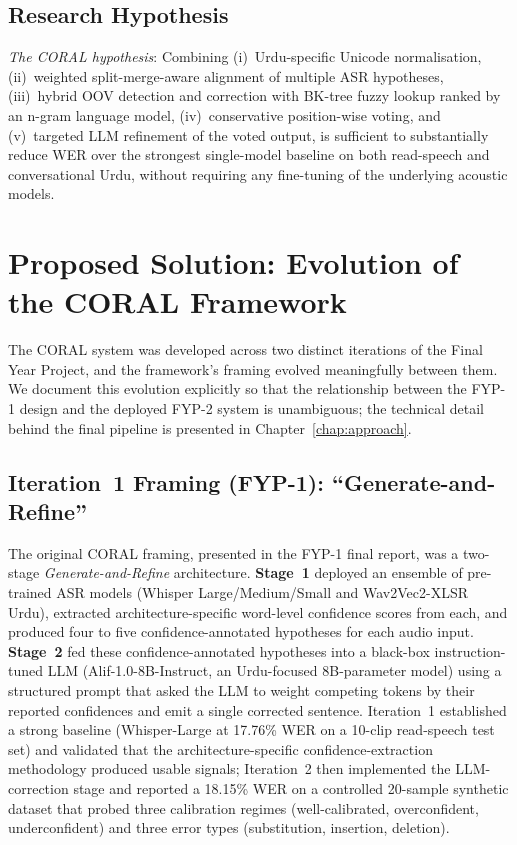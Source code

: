 \subsection{Research Hypothesis}
\label{ssec:hypothesis}

\textit{The CORAL hypothesis}: Combining (i)~Urdu-specific Unicode normalisation, (ii)~weighted split-merge-aware alignment of multiple ASR hypotheses, (iii)~hybrid OOV detection and correction with BK-tree fuzzy lookup ranked by an n-gram language model, (iv)~conservative position-wise voting, and (v)~targeted LLM refinement of the voted output, is sufficient to substantially reduce WER over the strongest single-model baseline on both read-speech and conversational Urdu, without requiring any fine-tuning of the underlying acoustic models.

\section{Proposed Solution: Evolution of the CORAL Framework}
\label{sec:proposed-solution-overview}

The CORAL system was developed across two distinct iterations of the Final Year Project, and the framework's framing evolved meaningfully between them. We document this evolution explicitly so that the relationship between the FYP-1 design and the deployed FYP-2 system is unambiguous; the technical detail behind the final pipeline is presented in Chapter~\ref{chap:approach}.

\subsection{Iteration~1 Framing (FYP-1): ``Generate-and-Refine''}
\label{ssec:iter1-framing}

The original CORAL framing, presented in the FYP-1 final report, was a two-stage \emph{Generate-and-Refine} architecture. \textbf{Stage~1} deployed an ensemble of pre-trained ASR models (Whisper Large/Medium/Small and Wav2Vec2-XLSR Urdu), extracted architecture-specific word-level confidence scores from each, and produced four to five confidence-annotated hypotheses for each audio input. \textbf{Stage~2} fed these confidence-annotated hypotheses into a black-box instruction-tuned LLM (Alif-1.0-8B-Instruct, an Urdu-focused 8B-parameter model) using a structured prompt that asked the LLM to weight competing tokens by their reported confidences and emit a single corrected sentence. Iteration~1 established a strong baseline (Whisper-Large at 17.76\% WER on a 10-clip read-speech test set) and validated that the architecture-specific confidence-extraction methodology produced usable signals; Iteration~2 then implemented the LLM-correction stage and reported a 18.15\% WER on a controlled 20-sample synthetic dataset that probed three calibration regimes (well-calibrated, overconfident, underconfident) and three error types (substitution, insertion, deletion).

